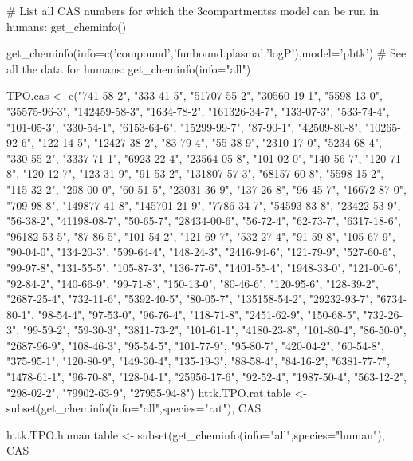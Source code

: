 \documentclass[a4paper]{book}
\begin{document}
%
\begin{Examples}
\begin{ExampleCode}


# List all CAS numbers for which the 3compartmentss model can be run in humans: 
get_cheminfo()

get_cheminfo(info=c('compound','funbound.plasma','logP'),model='pbtk') 
# See all the data for humans:
get_cheminfo(info="all")

TPO.cas <- c("741-58-2", "333-41-5", "51707-55-2", "30560-19-1", "5598-13-0", 
"35575-96-3", "142459-58-3", "1634-78-2", "161326-34-7", "133-07-3", "533-74-4", 
"101-05-3", "330-54-1", "6153-64-6", "15299-99-7", "87-90-1", "42509-80-8", 
"10265-92-6", "122-14-5", "12427-38-2", "83-79-4", "55-38-9", "2310-17-0", 
"5234-68-4", "330-55-2", "3337-71-1", "6923-22-4", "23564-05-8", "101-02-0", 
"140-56-7", "120-71-8", "120-12-7", "123-31-9", "91-53-2", "131807-57-3", 
"68157-60-8", "5598-15-2", "115-32-2", "298-00-0", "60-51-5", "23031-36-9", 
"137-26-8", "96-45-7", "16672-87-0", "709-98-8", "149877-41-8", "145701-21-9", 
"7786-34-7", "54593-83-8", "23422-53-9", "56-38-2", "41198-08-7", "50-65-7", 
"28434-00-6", "56-72-4", "62-73-7", "6317-18-6", "96182-53-5", "87-86-5", 
"101-54-2", "121-69-7", "532-27-4", "91-59-8", "105-67-9", "90-04-0", 
"134-20-3", "599-64-4", "148-24-3", "2416-94-6", "121-79-9", "527-60-6", 
"99-97-8", "131-55-5", "105-87-3", "136-77-6", "1401-55-4", "1948-33-0", 
"121-00-6", "92-84-2", "140-66-9", "99-71-8", "150-13-0", "80-46-6", "120-95-6",
"128-39-2", "2687-25-4", "732-11-6", "5392-40-5", "80-05-7", "135158-54-2", 
"29232-93-7", "6734-80-1", "98-54-4", "97-53-0", "96-76-4", "118-71-8", 
"2451-62-9", "150-68-5", "732-26-3", "99-59-2", "59-30-3", "3811-73-2", 
"101-61-1", "4180-23-8", "101-80-4", "86-50-0", "2687-96-9", "108-46-3", 
"95-54-5", "101-77-9", "95-80-7", "420-04-2", "60-54-8", "375-95-1", "120-80-9",
"149-30-4", "135-19-3", "88-58-4", "84-16-2", "6381-77-7", "1478-61-1", 
"96-70-8", "128-04-1", "25956-17-6", "92-52-4", "1987-50-4", "563-12-2", 
"298-02-2", "79902-63-9", "27955-94-8")
httk.TPO.rat.table <- subset(get_cheminfo(info="all",species="rat"),
 CAS %
 
httk.TPO.human.table <- subset(get_cheminfo(info="all",species="human"),
 CAS %


\end{ExampleCode}
\end{Examples}
\end{document}
